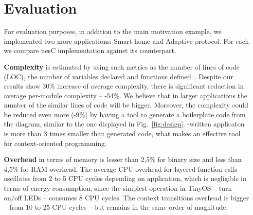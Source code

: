 \section{Evaluation}\label{sec:eval}

For evaluation purposes, in addition to the main motivation example, we
implemented two more applications: Smart-home and Adaptive protocol. For each we
compare nesC implementation against its \conesc counterpart.

{\bf Complexity} is estimated by using such metrics as the number of lines of
code (LOC), the number of variables declared and functions
defined~\cite{Pressman01}. Despite our results show 30\% increase of average
complexity, there is significant reduction in average per-module complexity --
-54\%. We believe that in larger applications the number of the similar lines of
code will be bigger. Moreover, the complexity could be reduced even more (-9\%)
by having a tool to generate a boilerplate code from the diagram, similar to the
one displayed in Fig.~\ref{fig:design}. \conesc-written applicaton is more than
3 times smaller than generated code, what makes \conesc an effective tool for
context-oriented programming.

{\bf Overhead} in terms of memory is lesser than
2,5\% for binary size and less than 4,5\% for RAM overhead. The average CPU
overhead for layered function calls oscillates from 2 to 5 CPU cycles depending
on application, which is negligible in terms of energy consumption, since the
simplest operation in TinyOS -- turn on/off LEDs -- consumes 8 CPU cycles. The
context transitions overhead is bigger -- from 10 to 25 CPU cycles -- but
remains in the same order of magnitude.
